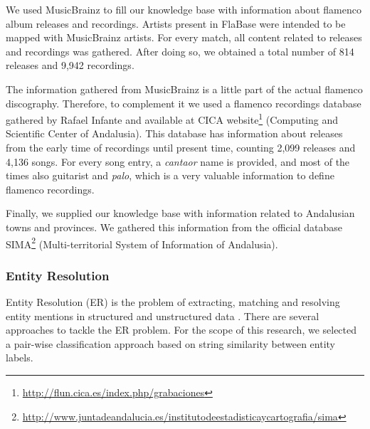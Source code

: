 We used MusicBrainz to fill our knowledge base with information about flamenco album releases and recordings. Artists present in FlaBase were intended to be mapped with MusicBrainz artists. For every match, all content related to releases and recordings was gathered. After doing so, we obtained a total number of 814 releases and 9,942 recordings. 

The information gathered from MusicBrainz is a little part of the actual flamenco discography. Therefore, to complement it we used a flamenco recordings database gathered by Rafael Infante and available at CICA website\footnote{\url{http://flun.cica.es/index.php/grabaciones}} (Computing and Scientific Center of Andalusia). This database has information about releases from the early time of recordings until present time, counting 2,099 releases and 4,136 songs. For every song entry, a \textit{cantaor} name is provided, and most of the times also guitarist and \textit{palo}, which is a very valuable information to define flamenco recordings.

Finally, we supplied our knowledge base with information related to Andalusian towns and provinces. We gathered this information from the official database SIMA\footnote{\url{http://www.juntadeandalucia.es/institutodeestadisticaycartografia/sima}} (Multi-territorial System of Information of Andalusia).%


\subsubsection{Entity Resolution}\label{sec:musicology:entity_resolution}

Entity Resolution (ER) is the problem of extracting, matching and resolving entity mentions in structured and unstructured data \cite{Getoor2012}. There are several approaches to tackle the ER problem. For the scope of this research, we selected a pair-wise classification approach based on string similarity between entity labels.

